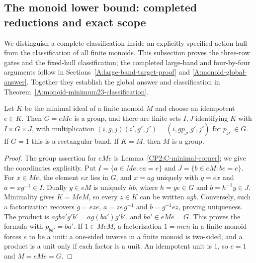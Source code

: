\subsection{The monoid lower bound: completed reductions and exact scope}
\label{A:monoid-lower-audit}

We distinguish a complete classification inside an explicitly specified
action hull from the classification of all finite monoids. This subsection
proves the three-row gates and the fixed-hull classification; the completed
large-band and four-by-four arguments follow in
Sections~\ref{A:large-band-target-proof} and \ref{A:monoid-global-answer}.
Together they establish the global answer and classification in
Theorem~\ref{A:monoid-minimum23-classification}.

\begin{lemma}
\label{A:minimal-ideal-coordinates}
Let $K$ be the minimal ideal of a finite monoid $M$ and choose
an idempotent $e\in K$. Then $G=eMe$ is a group, and there
are finite sets $I,J$ identifying $K$ with $I\times G\times J$,
with multiplication
$(i,g,j)(i',g',j')=(i,gp_{ji'}g',j')$ for $p_{ji'}\in G$.
If $G=1$ this is a rectangular band. If $K=M$, then $M$ is a group.
\end{lemma}
\begin{proof}
The group assertion for $eMe$ is
Lemma~\ref{CP2:C-minimal-corner}; we give the coordinates explicitly.
Put $I=\{a\in Me:ea=e\}$ and
$J=\{b\in eM:be=e\}$. For $x\in Me$, the element $ex$
lies in $G$, and $x=a g$ uniquely with $g=ex$ and
$a=xg^{-1}\in I$. Dually $y\in eM$ is uniquely $h b$,
where $h=ye\in G$ and $b=h^{-1}y\in J$.
Minimality gives $K=MeM$, so every $z\in K$ can be written
$a g b$. Conversely, such a factorization recovers
$g=eze$, $a=ze\,g^{-1}$ and $b=g^{-1}ez$, proving uniqueness.
The product is
$a g b a'g'b'=a g(ba')g'b'$, and $ba'\in eMe=G$.
This proves the formula with $p_{ba'}=ba'$.
If $1\in MeM$, a factorization $1=men$ in a finite monoid
forces $e$ to be a unit: a one-sided inverse in a finite
monoid is two-sided, and a product is a unit only if each
factor is a unit. An idempotent unit is $1$, so $e=1$ and
$M=eMe=G$.
\end{proof}

